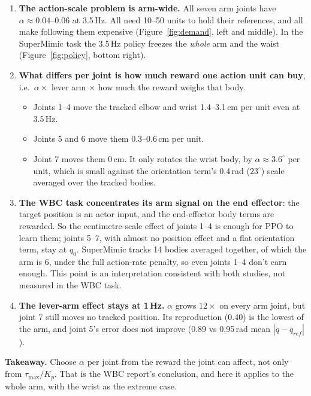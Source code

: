 \documentclass[10pt]{article}
\begin{document}
\begin{enumerate}
  \setlength{\itemsep}{1pt}
  \item \textbf{The action-scale problem is arm-wide.} All seven arm joints have
  $\alpha \approx 0.04$--$0.06$ at 3.5\,Hz. All need 10--50 units to hold their references, and all
  make following them expensive (Figure~\ref{fig:demand}, left and middle). In the SuperMimic task the
  3.5\,Hz policy freezes the \emph{whole} arm and the waist (Figure~\ref{fig:policy}, bottom right).
  \item \textbf{What differs per joint is how much reward one action unit can buy}, i.e.\
  $\alpha \times$ lever arm $\times$ how much the reward weighs that body.
  \begin{itemize}
    \item Joints 1--4 move the tracked elbow and wrist 1.4--3.1\,cm per unit even at 3.5\,Hz.
    \item Joints 5 and 6 move them 0.3--0.6\,cm per unit.
    \item Joint 7 moves them 0\,cm. It only rotates the wrist body, by $\alpha \approx 3.6^\circ$ per
    unit, which is small against the orientation term's $0.4$\,rad ($23^\circ$) scale averaged over the
    tracked bodies.
  \end{itemize}
  \item \textbf{The WBC task concentrates its arm signal on the end effector}: the target position is an
  actor input, and the end-effector body terms are rewarded. So the centimetre-scale effect of joints
  1--4 is enough for PPO to learn them; joints 5--7, with almost no position effect and a flat
  orientation term, stay at $q_0$. SuperMimic tracks 14 bodies averaged together, of which the arm is
  6, under the full action-rate penalty, so even joints 1--4 don't earn enough. This point is an
  interpretation consistent with both studies, not measured in the WBC task.
  \item \textbf{The lever-arm effect stays at 1\,Hz.} $\alpha$ grows $12\times$ on every arm joint, but
  joint 7 still moves no tracked position. Its reproduction (0.40) is the lowest of the arm, and joint
  5's error does not improve (0.89 vs 0.95\,rad mean $|q-q_{ref}|$).
\end{enumerate}

\textbf{Takeaway.} Choose $\alpha$ per joint from the reward the joint can affect, not only from
$\tau_{\max}/K_p$. That is the WBC report's conclusion, and here it applies to the whole arm, with the
wrist as the extreme case.
\end{document}
